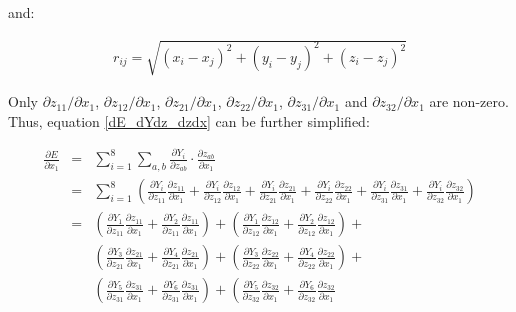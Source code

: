 \documentclass{article}
\begin{document}
\noindent and:

\begin{eqnarray}
r_{ij} = \sqrt{(x_i - x_j)^2 + (y_i - y_j)^2 + (z_i - z_j)^2}
\end{eqnarray}

\noindent Only $\partial{z_{11}} / \partial{x_1}$, 
$\partial{z_{12}} / \partial{x_1}$, $\partial{z_{21}} / \partial{x_1}$,
$\partial{z_{22}} / \partial{x_1}$, $\partial{z_{31}} / \partial{x_1}$ and
$\partial{z_{32}} / \partial{x_1}$ are non-zero. Thus, equation \ref{dE_dYdz_dzdx} 
can be further simplified:

\begin{eqnarray}
\frac{\partial{E}}{\partial{x_1}} 
& = & 
\sum_{i=1}^{8}{
	\sum_{a,b}{
		\frac{\partial{Y_{i}}}{\partial{z_{ab}}} 
		\cdot 
		\frac{\partial{z_{ab}}}{\partial{x_{1}}}
	}
} \nonumber \\
& = & 
\sum_{i=1}^{8}{\left(
	\frac{\partial{Y_{i}}}{\partial{z_{11}}}\frac{\partial{z_{11}}}{\partial{x_1}} +
	\frac{\partial{Y_{i}}}{\partial{z_{12}}}\frac{\partial{z_{12}}}{\partial{x_1}} +
	\frac{\partial{Y_{i}}}{\partial{z_{21}}}\frac{\partial{z_{21}}}{\partial{x_1}} +
	\frac{\partial{Y_{i}}}{\partial{z_{22}}}\frac{\partial{z_{22}}}{\partial{x_1}} +
	\frac{\partial{Y_{i}}}{\partial{z_{31}}}\frac{\partial{z_{31}}}{\partial{x_1}} +
	\frac{\partial{Y_{i}}}{\partial{z_{32}}}\frac{\partial{z_{32}}}{\partial{x_1}}
\right)
} \nonumber \\
& = &
\left(
	\frac{\partial{Y_{1}}}{\partial{z_{11}}}\frac{\partial{z_{11}}}{\partial{x_1}} +
	\frac{\partial{Y_{2}}}{\partial{z_{11}}}\frac{\partial{z_{11}}}{\partial{x_1}} 
\right) +
\left(
	\frac{\partial{Y_{1}}}{\partial{z_{12}}}\frac{\partial{z_{12}}}{\partial{x_1}} +
	\frac{\partial{Y_{2}}}{\partial{z_{12}}}\frac{\partial{z_{12}}}{\partial{x_1}} 
\right) + \nonumber \\
&&
\left(
	\frac{\partial{Y_{3}}}{\partial{z_{21}}}\frac{\partial{z_{21}}}{\partial{x_1}} +
	\frac{\partial{Y_{4}}}{\partial{z_{21}}}\frac{\partial{z_{21}}}{\partial{x_1}} 
\right) +
\left(
	\frac{\partial{Y_{3}}}{\partial{z_{22}}}\frac{\partial{z_{22}}}{\partial{x_1}} +
	\frac{\partial{Y_{4}}}{\partial{z_{22}}}\frac{\partial{z_{22}}}{\partial{x_1}} 
\right) + \nonumber \\
&&
\left(
	\frac{\partial{Y_{5}}}{\partial{z_{31}}}\frac{\partial{z_{31}}}{\partial{x_1}} +
	\frac{\partial{Y_{6}}}{\partial{z_{31}}}\frac{\partial{z_{31}}}{\partial{x_1}} 
\right) +
\left(
	\frac{\partial{Y_{5}}}{\partial{z_{32}}}\frac{\partial{z_{32}}}{\partial{x_1}} +
	\frac{\partial{Y_{6}}}{\partial{z_{32}}}\frac{\partial{z_{32}}}{\partial{x_1}}

\end{eqnarray}
\end{document}

